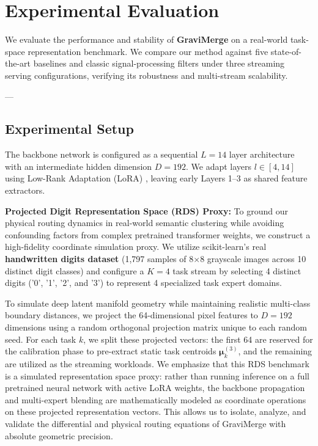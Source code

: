 \section{Experimental Evaluation}
\label{sec:experiments}

We evaluate the performance and stability of \textbf{GraviMerge} on a real-world task-space representation benchmark. We compare our method against five state-of-the-art baselines and classic signal-processing filters under three streaming serving configurations, verifying its robustness and multi-stream scalability.

---

\vspace{-5pt}
\subsection{Experimental Setup}
The backbone network is configured as a sequential $L = 14$ layer architecture with an intermediate hidden dimension $D = 192$. We adapt layers $l \in [4, 14]$ using Low-Rank Adaptation (LoRA) \cite{hu21lora}, leaving early Layers 1--3 as shared feature extractors. 

\textbf{Projected Digit Representation Space (RDS) Proxy: } To ground our physical routing dynamics in real-world semantic clustering while avoiding confounding factors from complex pretrained transformer weights, we construct a high-fidelity coordinate simulation proxy. We utilize scikit-learn's real \textbf{handwritten digits dataset} \cite{load_digits} (1,797 samples of 8$\times$8 grayscale images across 10 distinct digit classes) and configure a $K = 4$ task stream by selecting 4 distinct digits ('0', '1', '2', and '3') to represent 4 specialized task expert domains. 

To simulate deep latent manifold geometry while maintaining realistic multi-class boundary distances, we project the 64-dimensional pixel features to $D = 192$ dimensions using a random orthogonal projection matrix unique to each random seed. For each task $k$, we split these projected vectors: the first 64 are reserved for the calibration phase to pre-extract static task centroids $\boldsymbol{\mu}_k^{(3)}$, and the remaining are utilized as the streaming workloads. We emphasize that this RDS benchmark is a simulated representation space proxy: rather than running inference on a full pretrained neural network with active LoRA weights, the backbone propagation and multi-expert blending are mathematically modeled as coordinate operations on these projected representation vectors. This allows us to isolate, analyze, and validate the differential and physical routing equations of GraviMerge with absolute geometric precision.


